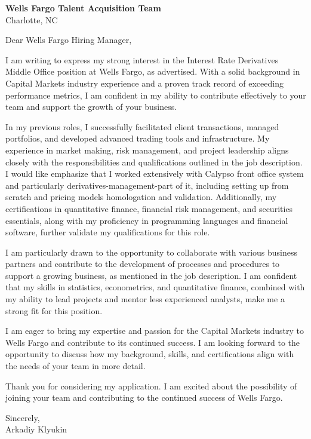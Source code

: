 \documentclass{letter}
\begin{document}
\begin{letter}{\textbf{Wells Fargo Talent Acquisition Team} \\
                Charlotte, NC}


\opening{Dear Wells Fargo Hiring Manager,}

I am writing to express my strong interest in the Interest Rate Derivatives Middle Office position at Wells Fargo, as advertised. With a solid background in Capital Markets industry experience and a proven track record of exceeding performance metrics, I am confident in my ability to contribute effectively to your team and support the growth of your business.

In my previous roles, I successfully facilitated client transactions, managed portfolios, and developed advanced trading tools and infrastructure. My experience in market making, risk management, and project leadership aligns closely with the responsibilities and qualifications outlined in the job description. I would like emphasize that I worked extensively with Calypso front office system and particularly derivatives-management-part of it, including setting up from scratch and pricing models homologation and validation. Additionally, my certifications in quantitative finance, financial risk management, and securities essentials, along with my proficiency in programming languages and financial software, further validate my qualifications for this role.

I am particularly drawn to the opportunity to collaborate with various business partners and contribute to the development of processes and procedures to support a growing business, as mentioned in the job description. I am confident that my skills in statistics, econometrics, and quantitative finance, combined with my ability to lead projects and mentor less experienced analysts, make me a strong fit for this position.

I am eager to bring my expertise and passion for the Capital Markets industry to Wells Fargo and contribute to its continued success. I am looking forward to the opportunity to discuss how my background, skills, and certifications align with the needs of your team in more detail.

Thank you for considering my application. I am excited about the possibility of joining your team and contributing to the continued success of Wells Fargo.

Sincerely,\\
Arkadiy Klyukin
\end{letter}
\end{document}
